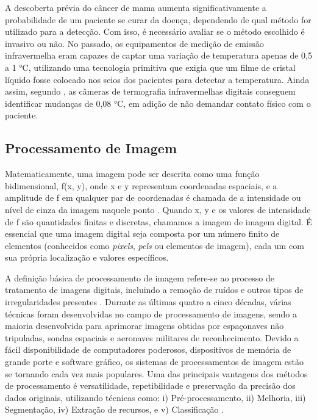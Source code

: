 A descoberta prévia do câncer de mama aumenta significativamente a probabilidade de um paciente se curar da doença, dependendo de qual método for utilizado para a detecção. Com isso, é necessário avaliar se o método escolhido é invasivo ou não. No passado, os equipamentos de medição de emissão infravermelha eram capazes de captar uma variação de temperatura apenas de 0,5 a 1 °C, utilizando uma tecnologia primitiva que exigia que um filme de cristal líquido fosse colocado nos seios dos pacientes para detectar a temperatura. Ainda assim, segundo , as câmeras de termografia infravermelhas digitais conseguem identificar mudanças de 0,08 °C, em adição de não demandar contato físico com o paciente.



\subsection{\esp Processamento de Imagem} \label{procesamentoimg}

Matematicamente, uma imagem pode ser descrita como uma função bidimensional, f(x, y), onde x e y representam coordenadas espaciais, e a amplitude de f em qualquer par de coordenadas é chamada de a intensidade ou nível de cinza da imagem naquele ponto \cite{techniques}. Quando x, y e os valores de intensidade de f são quantidades finitas e discretas, chamamos a imagem de imagem digital. É essencial que uma imagem digital seja composta por um número finito de elementos (conhecidos como \textit{pixels}, \textit{pels} ou elementos de imagem), cada um com sua própria localização e valores específicos. 

A definição básica de processamento de imagem refere-se ao processo de tratamento de imagens digitais, incluindo a remoção de ruídos e outros tipos de irregularidades presentes \cite{histopathological}. Durante as últimas quatro a cinco décadas, várias técnicas foram desenvolvidas no campo de processamento de imagens, sendo a maioria desenvolvida para aprimorar imagens obtidas por espaçonaves não tripuladas, sondas espaciais e aeronaves militares de reconhecimento. Devido a fácil disponibilidade de computadores poderosos, dispositivos de memória de grande porte e software gráfico, os sistemas de processamentos de imagem estão se tornando cada vez mais populares. Uma das principais vantagens dos métodos de processamento é versatilidade, repetibilidade e preservação da precisão dos dados originais, utilizando técnicas como: i) Pré-processamento, ii) Melhoria, iii) Segmentação, iv) Extração de recursos, e v) Classificação \cite{lungcancer}.

